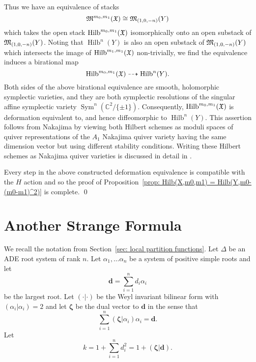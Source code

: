 \documentclass{article}
\theoremstyle{definition}
\newcommand{\CC} {{\mathbb C}}          %
\newcommand{\X}{\frak{X}}
\newcommand{\M}{\frak{M}}
\newcommand{\zetavec}{\bm{\zeta }}
\newcommand{\dvec}{\bm{d }}
\newcommand{\Sym}{\operatorname{Sym}}
\newcommand{\Hilb}{\operatorname{Hilb}}
\begin{document}
Thus we have an equivalence of stacks
\[
\M^{m_{0},m_{1}}(\X ) \cong \M_{(1,0,-n)}(Y)
\]
which takes the open stack $\Hilb^{m_{0},m_{1}}(\X )$ isomorphically
onto an open substack of $\M_{(1,0,-n)} (Y)$. Noting that
$\Hilb^{n}(Y)$ is also an open substack of $\M_{(1,0,-n)} (Y)$ which
intersects the image of $\Hilb^{m_{1},m_{1}}(\X )$ non-trivially, we
find the equivalence induces a birational map
\[
\Hilb^{m_{0},m_{1}}(\X ) \dashrightarrow \Hilb^{n}(Y).
\]
Both sides of the above birational equivalence are smooth, holomorphic
symplectic varieties, and they are both symplectic resolutions of the
singular affine symplectic variety $\Sym^{n} (\CC^{2}/\{\pm 1
\})$. Consequently, $\Hilb^{m_{0},m_{1}}(\X )$ is deformation
equivalent to, and hence diffeomorphic to $\Hilb^{n}(Y)$. This
assertion follows from Nakajima \cite[Cor~4.2]{Nakajima1994Duke} by
viewing both Hilbert schemes as moduli spaces of quiver
representations of the $A_{1}$ Nakajima quiver variety having the same
dimension vector but using different stability conditions. Writing
these Hilbert schemes as Nakajima quiver varieties is discussed in
detail in \cite{Kuznetsov}.


Every step in the above constructed deformation equivalence is
compatible with the $H$ action and so the proof of
Proposition~\ref{prop: Hilb(X,m0,m1) = Hilb(Y,m0-(m0-m1)^2)} is
complete. \qed 



\section{Another Strange Formula}\label{sec: another strange
formula}

We recall the notation from Section~\ref{sec: local partition
functions}. Let $\Delta$ be an ADE root system of rank $n$. Let
$\alpha_{1},\dotsc \alpha_{n}$ be a system of positive simple roots
and let
\[
\dvec  = \sum_{i=1}^{n} d_{i} \alpha_{i}
\]
be the largest root. Let $(\cdot |\cdot )$ be the Weyl invariant
bilinear form with $(\alpha_{i}|\alpha_{i})=2$ and let $\zetavec$ be
the dual vector to $\dvec$ in the sense that
\begin{equation}\label{eqn: d = sum (zeta|ai)ai}
\sum_{i=1}^{n} (\zetavec |\alpha_{i}) \alpha_{i} = \dvec .
\end{equation}
Let 
\begin{equation}\label{eqn: k=1+(zeta|d)}
k=1+\sum_{i=1}^{n}d_{i}^{2} =  1+(\zetavec |\dvec ). 
\end{equation}
\end{document}
